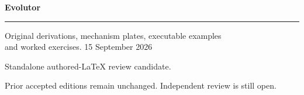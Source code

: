 \documentclass[11pt,oneside,openany]{book}
\begin{document}
\frontmatter
\begin{titlepage}
\color{Blue}\sffamily\vspace*{20mm}
{\Huge\bfseries Evolutor\par}
\vspace{10mm}{\LARGE Chapter 5\par}
\vspace{8mm}{\Large Tokenization and sequence representation\par}
\vspace{12mm}\rule{\linewidth}{.8pt}
\vspace{6mm}\par Original derivations, mechanism plates, executable examples\\and worked exercises.
\vfill 15 September 2026\par
Standalone authored-LaTeX review candidate.\par
Prior accepted editions remain unchanged. Independent review is still open.
\end{titlepage}
\tableofcontents
\mainmatter
\setcounter{chapter}{4}

\backmatter

\printindex
\end{document}
